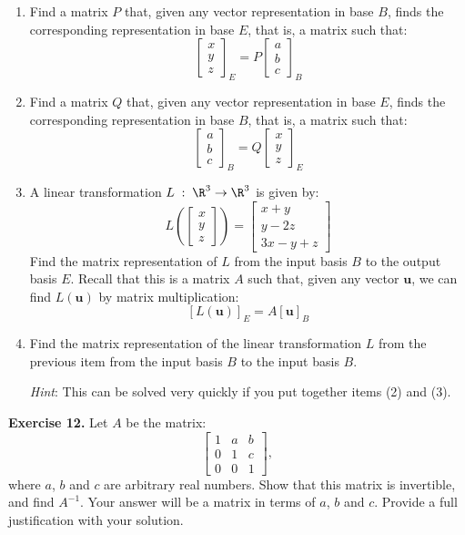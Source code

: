\documentclass[12pt]{article}
\begin{document}
\begin{enumerate}
\item Find a matrix $P$ that, given any vector representation in base $B$, finds the corresponding representation in base $E$, that is, a matrix such that:
\[
\begin{bmatrix}x\\y\\z\end{bmatrix}_E = P \begin{bmatrix}a\\b\\c\end{bmatrix}_B
\]

\item Find a matrix $Q$ that, given any vector representation in base $E$, finds the corresponding representation in base $B$, that is, a matrix such that:
\[
\begin{bmatrix}a\\b\\c\end{bmatrix}_B = Q \begin{bmatrix}x\\y\\z\end{bmatrix}_E 
\]

\item A linear transformation $L\;:\;\R^3\to\R^3$ is given by:
\[
L\left(\begin{bmatrix}x\\y\\z\end{bmatrix}\right)=\begin{bmatrix}x+y\\y-2z\\3x-y+z\end{bmatrix}
\]
Find the matrix representation of $L$ from the input basis $B$ to the output basis $E$. Recall that this is a matrix $A$ such that, given any vector $\mathbf{u}$,
we can find $L(\mathbf{u})$ by matrix multiplication:
\[
[L(\mathbf{u})]_E=A[\mathbf{u}]_B
\]

\item Find the matrix representation of the linear transformation $L$ from the previous item from the input basis $B$ to the input basis $B$.

\emph{Hint}: This can be solved very quickly if you put together items (2) and (3).
\end{enumerate}

\textbf{Exercise 12.} Let $A$ be the matrix:
\[
\begin{bmatrix} 1 & a & b \\ 0 & 1 & c \\ 0 & 0 & 1\end{bmatrix},
\] 
where $a$, $b$ and $c$ are arbitrary real numbers. Show that this matrix is invertible, and find $A^{-1}$. Your answer will be a matrix in terms of $a$, $b$ and $c$. Provide a full justification with your solution.
\end{document}
